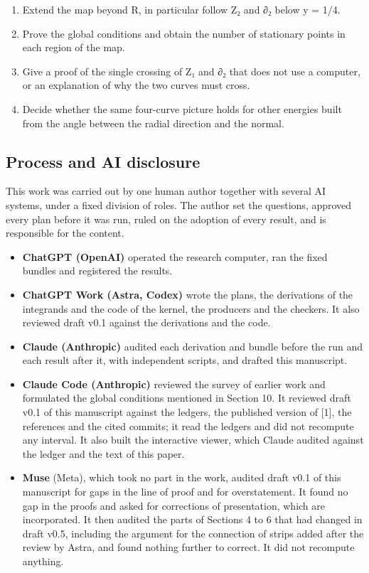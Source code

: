 \documentclass[
  11pt,
]{article}
\providecommand{\tightlist}{%
  \setlength{\itemsep}{0pt}\setlength{\parskip}{0pt}}
\begin{document}
\begin{enumerate}
\def\labelenumi{\arabic{enumi}.}
\tightlist
\item
  Extend the map beyond R, in particular follow Z₂ and ∂₂ below y = 1/4.
\item
  Prove the global conditions and obtain the number of stationary points
  in each region of the map.
\item
  Give a proof of the single crossing of Z₁ and ∂₂ that does not use a
  computer, or an explanation of why the two curves must cross.
\item
  Decide whether the same four-curve picture holds for other energies
  built from the angle between the radial direction and the normal.
\end{enumerate}

\subsection{Process and AI disclosure}

This work was carried out by one human author together with several AI
systems, under a fixed division of roles. The author set the questions,
approved every plan before it was run, ruled on the adoption of every
result, and is responsible for the content.

\begin{itemize}
\tightlist
\item
  \textbf{ChatGPT (OpenAI)} operated the research computer, ran the
  fixed bundles and registered the results.
\item
  \textbf{ChatGPT Work (Astra, Codex)} wrote the plans, the derivations
  of the integrands and the code of the kernel, the producers and the
  checkers. It also reviewed draft v0.1 against the derivations and the
  code.
\item
  \textbf{Claude (Anthropic)} audited each derivation and bundle before
  the run and each result after it, with independent scripts, and
  drafted this manuscript.
\item
  \textbf{Claude Code (Anthropic)} reviewed the survey of earlier work
  and formulated the global conditions mentioned in Section 10. It
  reviewed draft v0.1 of this manuscript against the ledgers, the
  published version of {[}1{]}, the references and the cited commits; it
  read the ledgers and did not recompute any interval. It also built the
  interactive viewer, which Claude audited against the ledger and the
  text of this paper.
\item
  \textbf{Muse} (Meta), which took no part in the work, audited draft
  v0.1 of this manuscript for gaps in the line of proof and for
  overstatement. It found no gap in the proofs and asked for corrections
  of presentation, which are incorporated. It then audited the parts of
  Sections 4 to 6 that had changed in draft v0.5, including the argument
  for the connection of strips added after the review by Astra, and
  found nothing further to correct. It did not recompute anything.
\end{itemize}
\end{document}
